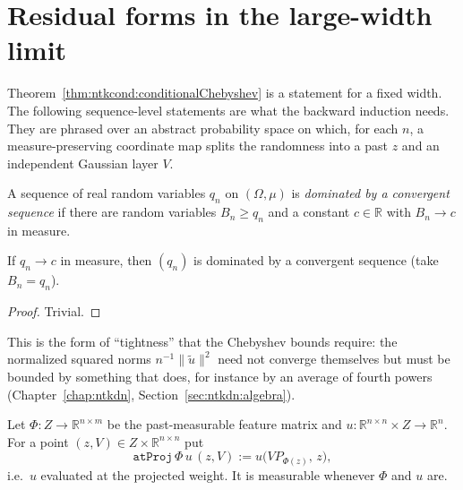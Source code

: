 \section{Residual forms in the large-width limit}\label{sec:ntkcond:residual}

Theorem~\ref{thm:ntkcond:conditionalChebyshev} is a statement for a fixed width. The following sequence-level statements are what the backward induction needs. They are phrased over an abstract probability space on which, for each $n$, a measure-preserving coordinate map splits the randomness into a past $z$ and an independent Gaussian layer $V$.

\begin{definition}\label{def:ntkcond:bddByConv}
  \leanok
A sequence of real random variables $q_n$ on $(\Omega,\mu)$ is \emph{dominated by a convergent sequence} if there are random variables $B_n\ge q_n$ and a constant $c\in\mathbb R$ with $B_n\to c$ in measure.
\end{definition}

\begin{lemma}\label{lem:ntkcond:bddByConvOf}
  \leanok
If $q_n\to c$ in measure, then $(q_n)$ is dominated by a convergent sequence (take $B_n=q_n$).
\end{lemma}

\begin{proof}
  \leanok
Trivial.
\end{proof}

This is the form of ``tightness'' that the Chebyshev bounds require: the normalized squared norms $n^{-1}\|\tilde u\|^2$ need not converge themselves but must be bounded by something that does, for instance by an average of fourth powers (Chapter~\ref{chap:ntkdn}, Section~\ref{sec:ntkdn:algebra}).

\begin{definition}\label{def:ntkcond:atProj}
  \leanok
Let $\Phi:Z\to\mathbb R^{n\times m}$ be the past-measurable feature matrix and $u:\mathbb R^{n\times n}\times Z\to\mathbb R^n$. For a point $(z,V)\in Z\times\mathbb R^{n\times n}$ put
\[
  \texttt{atProj}\,\Phi\,u\,(z,V):=u\bigl(VP_{\Phi(z)},\,z\bigr),
\]
i.e.\ $u$ evaluated at the projected weight. It is measurable whenever $\Phi$ and $u$ are.
\end{definition}

